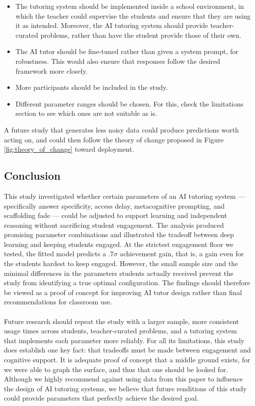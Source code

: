 \documentclass[12pt]{article}
\begin{document}
\begin{itemize}
    \item The tutoring system should be implemented inside a school environment, in which the teacher could supervise the students and ensure that they are using it as intended. Moreover, the AI tutoring system should provide teacher-curated problems, rather than have the student provide those of their own.
    \item The AI tutor should be fine-tuned rather than given a system prompt, for robustness. This would also ensure that responses follow the desired framework more closely.
    \item More participants should be included in the study.
    \item Different parameter ranges should be chosen. For this, check the limitations section to see which ones are not suitable as is.
\end{itemize}

A future study that generates less noisy data could produce predictions worth acting on, and could then follow the theory of change proposed in Figure \ref{fig:theory_of_change} toward deployment.

\subsection{Conclusion}

This study investigated whether certain parameters of an AI tutoring system --- specifically answer specificity, access delay, metacognitive prompting, and scaffolding fade --- could be adjusted to support learning and independent reasoning without sacrificing student engagement. The analysis produced promising parameter combinations and illustrated the tradeoff between deep learning and keeping students engaged. At the strictest engagement floor we tested, the fitted model predicts a $.7\sigma$ achievement gain, that is, a gain even for the students hardest to keep engaged. However, the small sample size and the minimal differences in the parameters students actually received prevent the study from identifying a true optimal configuration. The findings should therefore be viewed as a proof of concept for improving AI tutor design rather than final recommendations for classroom use.
\\\\
Future research should repeat the study with a larger sample, more consistent usage times across students, teacher-curated problems, and a tutoring system that implements each parameter more reliably. For all its limitations, this study does establish one key fact: that tradeoffs must be made between engagement and cognitive support. It is adequate proof of concept that a middle ground exists, for we were able to graph the surface, and thus that one should be looked for. Although we highly recommend against using data from this paper to influence the design of AI tutoring systems, we believe that future renditions of this study could provide parameters that perfectly achieve the desired goal.
\end{document}
